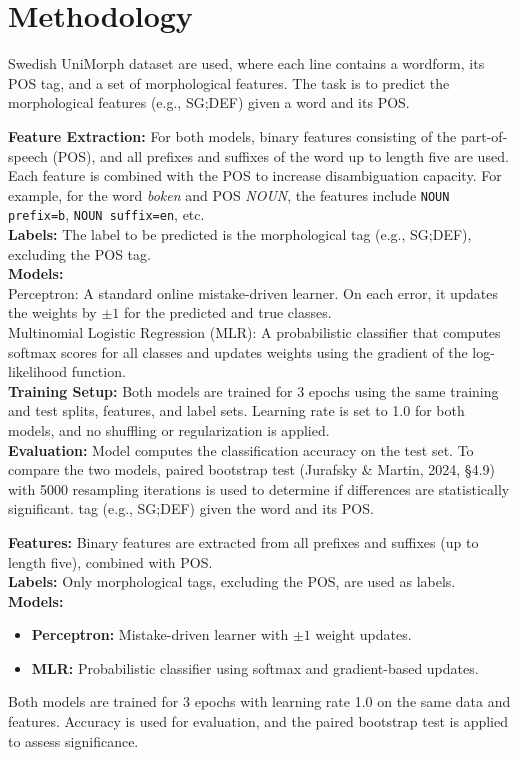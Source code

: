 \documentclass[11pt]{article}
\begin{document}
\section{Methodology}
Swedish UniMorph dataset are used, where each line contains a wordform, its POS tag, and a set of morphological features. The task is to predict the morphological features (e.g., SG;DEF) given a word and its POS.

\textbf{Feature Extraction:} For both models, binary features consisting of the part-of-speech (POS), and all prefixes and suffixes of the word up to length five are used. Each feature is combined with the POS to increase disambiguation capacity. For example, for the word \textit{boken} and POS \textit{NOUN}, the features include \texttt{NOUN prefix=b}, \texttt{NOUN suffix=en}, etc.\\
\textbf{Labels:} The label to be predicted is the morphological tag (e.g., SG;DEF), excluding the POS tag.\\
\textbf{Models:} \\Perceptron: A standard online mistake-driven learner. On each error, it updates the weights by \(\pm1\) for the predicted and true classes.\\Multinomial Logistic Regression (MLR): A probabilistic classifier that computes softmax scores for all classes and updates weights using the gradient of the log-likelihood function.\\
\textbf{Training Setup:} Both models are trained for 3 epochs using the same training and test splits, features, and label sets. Learning rate is set to 1.0 for both models, and no shuffling or regularization is applied.\\
\textbf{Evaluation:} Model computes the classification accuracy on the test set. To compare the two models, paired bootstrap test (Jurafsky \& Martin, 2024, \S4.9) with 5000 resampling iterations is used to determine if differences are statistically significant.
 tag (e.g., SG;DEF) given the word and its POS.

\textbf{Features:} Binary features are extracted from all prefixes and suffixes (up to length five), combined with POS. \\
\textbf{Labels:} Only morphological tags, excluding the POS, are used as labels. \\
\textbf{Models:}
\begin{itemize}
  \item \textbf{Perceptron:} Mistake-driven learner with \(\pm1\) weight updates.
  \item \textbf{MLR:} Probabilistic classifier using softmax and gradient-based updates.
\end{itemize}
Both models are trained for 3 epochs with learning rate 1.0 on the same data and features. Accuracy is used for evaluation, and the paired bootstrap test is applied to assess significance.
\end{document}
